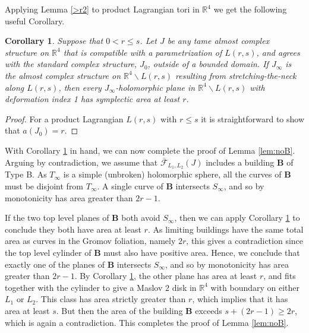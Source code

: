 \documentclass[12pt]{amsart}
\newtheorem{corollary}[theorem]{Corollary}
\theoremstyle{definition}
\newcommand{\RR}{{\mathbb R}}
\begin{document}
Applying Lemma \ref{>r2} to product Lagrangian tori in $\RR^4$ we get the following useful Corollary.

\begin{corollary}\label{>r}
Suppose that $0< r\leq s$. Let $J$ be any tame almost complex structure on $\RR^4$ that is compatible with a parametrization of $L(r,s)$, and agrees with the standard complex structure, $J_0$, outside of a bounded domain.
If $J_{\infty}$ is the almost complex structure on $\RR^4 \smallsetminus L(r,s)$ resulting from stretching-the-neck along $L(r,s)$, then every $J_{\infty}$-holomorphic plane in $\RR^4 \smallsetminus L(r,s)$ with  deformation index 1 has symplectic area at least $r$. 
\end{corollary}

\begin{proof} For a product Lagrangian $L(r,s)$ with $r\le s$ it is straightforward to show that $a(J_0) =r$.
    
\end{proof}

With Corollary \ref{>r} in hand, we can now complete the proof of Lemma \ref{lem:noB}.
Arguing by contradiction, we assume that $\bar{\mathcal{F}}_{L_1,L_2}(J)$ includes a building $\mathbf{B}$ of Type B. As $T_{\infty}$ is a simple (unbroken) holomorphic sphere, all the curves of $\mathbf{B}$ must be disjoint from $T_{\infty}$. A single curve of $\mathbf{B}$ intersects $S_{\infty}$, and so by monotonicity has area greater than $2r-1$.

If the two top level planes of $\mathbf{B}$ both avoid $S_{\infty}$, then we can apply Corollary \ref{>r} to conclude they both have area at least $r$. As limiting buildings have the same total area as curves in the Gromov foliation, namely $2r$, this gives a contradiction since the top level cylinder of $\mathbf{B}$ must also have positive area. Hence, we conclude that exactly one of the planes of $\mathbf{B}$ intersects $S_{\infty}$, and so by monotonicity has area greater than $2r-1$. By Corollary \ref{>r}, the other plane has area at least $r$, and fits together with the cylinder to give a Maslov $2$ disk in $\RR^4$ with boundary on either $L_1$ or $L_2$. This class has area strictly greater than $r$, which implies that it has area at least $s$. But then the area of the building $\mathbf{B}$ exceeds $s + (2r-1) \ge 2r$, which is again a contradiction. This completes the proof of Lemma \ref{lem:noB}.
\end{document}
